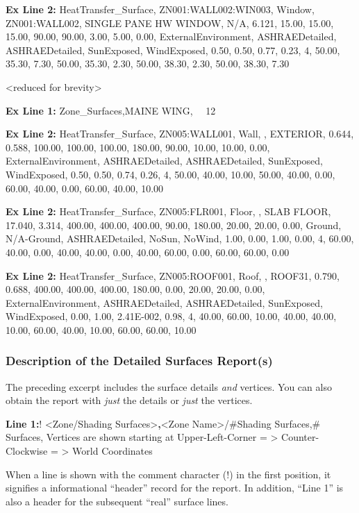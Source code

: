 \textbf{Ex Line 2:} HeatTransfer\_Surface, ZN001:WALL002:WIN003, Window, ZN001:WALL002, SINGLE PANE HW WINDOW, N/A, 6.121, 15.00, 15.00, 15.00, 90.00, 90.00, 3.00, 5.00, 0.00, ExternalEnvironment, ASHRAEDetailed, ASHRAEDetailed, SunExposed, WindExposed, 0.50, 0.50, 0.77, 0.23, 4, 50.00, 35.30, 7.30, 50.00, 35.30, 2.30, 50.00, 38.30, 2.30, 50.00, 38.30, 7.30

\textless{}reduced for brevity\textgreater{}

\textbf{Ex Line 1:} Zone\_Surfaces,MAINE WING,~~ 12

\textbf{Ex Line 2:} HeatTransfer\_Surface, ZN005:WALL001, Wall, , EXTERIOR, 0.644, 0.588, 100.00, 100.00, 100.00, 180.00, 90.00, 10.00, 10.00, 0.00, ExternalEnvironment, ASHRAEDetailed, ASHRAEDetailed, SunExposed, WindExposed, 0.50, 0.50, 0.74, 0.26, 4, 50.00, 40.00, 10.00, 50.00, 40.00, 0.00, 60.00, 40.00, 0.00, 60.00, 40.00, 10.00

\textbf{Ex Line 2:} HeatTransfer\_Surface, ZN005:FLR001, Floor, , SLAB FLOOR, 17.040, 3.314, 400.00, 400.00, 400.00, 90.00, 180.00, 20.00, 20.00, 0.00, Ground, N/A-Ground, ASHRAEDetailed, NoSun, NoWind, 1.00, 0.00, 1.00, 0.00, 4, 60.00, 40.00, 0.00, 40.00, 40.00, 0.00, 40.00, 60.00, 0.00, 60.00, 60.00, 0.00

\textbf{Ex Line 2:} HeatTransfer\_Surface, ZN005:ROOF001, Roof, , ROOF31, 0.790, 0.688, 400.00, 400.00, 400.00, 180.00, 0.00, 20.00, 20.00, 0.00, ExternalEnvironment, ASHRAEDetailed, ASHRAEDetailed, SunExposed, WindExposed, 0.00, 1.00, 2.41E-002, 0.98, 4, 40.00, 60.00, 10.00, 40.00, 40.00, 10.00, 60.00, 40.00, 10.00, 60.00, 60.00, 10.00

\subsubsection{Description of the Detailed Surfaces Report(s)}\label{description-of-the-detailed-surfaces-reports}

The preceding excerpt includes the surface details \emph{and} vertices. You can also obtain the report with \emph{just} the details or \emph{just} the vertices.

\textbf{Line 1:}! \textless{}Zone/Shading Surfaces\textgreater{}\textbf{,}\textless{}Zone Name\textgreater{}/\#Shading Surfaces,\# Surfaces, Vertices are shown starting at Upper-Left-Corner = \textgreater{} Counter-Clockwise = \textgreater{} World Coordinates

When a line is shown with the comment character (!) in the first position, it signifies a informational ``header'' record for the report. In addition, ``Line 1'' is also a header for the subsequent ``real'' surface lines.

